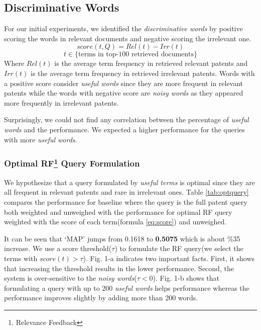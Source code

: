 \documentclass{sig-alternate}
\begin{document}
\subsection{Discriminative Words}
For our initial experiments, we identified the {\em discriminative words} by positive scoring the words in relevant documents and negative scoring the irrelevant one. 
\begin{equation}
score(t,Q)=Rel(t)-Irr(t) 
 \label{eq:score}
\end{equation}
\begin{displaymath}t\in \lbrace \mbox{terms in top-100 retrieved documents}\rbrace\end{displaymath}
Where $ Rel(t) $ is the average term frequency in retrieved relevant patents and $ Irr(t) $ is the average term frequency in retrieved irrelevant patents. Words with a positive score consider {\em useful words} since they are more frequent in relevant patents while the words with negative score are {\em noisy words} as they appeared more frequently in irrelevant patents. 

Surprisingly, we could not find any correlation between the percentage of {\em useful words} and the performance. We expected a higher performance for the queries with more {\em useful words}. 

\subsubsection{Optimal RF\protect\footnote{Relevance Feedback} Query Formulation}
We hypothesize that a query formulated by {\em useful terms} is optimal since they are all frequent in relevant patents and rare in irrelevant ones. Table \ref{tab:optquery} compares the performance for baseline where the query is the full patent query both weighted and unweighed with the performance for optimal RF query weighted with the score of each term(formula \ref{eq:score}) and unweighed. 

\begin{table}[htpb]
  \begin{center}
   \caption{.}
     
  \label{tab:optquery}
  \end{center}  
\end{table}

It can be seen that `MAP' jumps from 0.1618 to \textbf{0.5075} which is about \%35 increase. We use a score threshold($\tau$) to formulate the RF query(we select the terms with $ score(t)>\tau $). Fig. 1-a indicates two important facts. First, it shows that increasing the threshold results in the lower performance. Second, the system is over-sensitive to the {\em noisy words}($ \tau<0 $).  Fig. 1-b shows that formulating a query with up to 200 {\em useful words} helps performance whereas the performance improves slightly by adding more than 200 words. 
\end{document}
